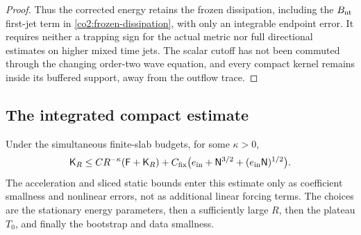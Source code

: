 \begin{proof}
Thus the corrected energy retains the frozen dissipation, including the
$B_{\rm nt}$ first-jet term in \eqref{co2:frozen-dissipation}, with only an
integrable endpoint error.  It requires neither a trapping sign for the
actual metric nor full directional estimates on higher mixed time jets.
The scalar cutoff has not been commuted through the changing order-two wave
equation, and every compact kernel remains inside its buffered support,
away from the outflow trace.
\end{proof}

\subsection{The integrated compact estimate}

\begin{proposition}\label{co2:compact-high}
Under the simultaneous finite-slab budgets, for some $\kappa>0$,
\begin{equation}\label{co2:high-bound}
 \mathsf K_R\le C R^{-\kappa}(\mathsf F+\mathsf K_R)
       +C_{\rm fix}\bigl(e_{\rm in}+\mathsf N^{3/2}
                                 +(e_{\rm in}\mathsf N)^{1/2}\bigr).
\end{equation}
The acceleration and sliced static bounds enter this estimate only as
coefficient smallness and nonlinear errors, not as additional linear forcing
terms.  The choices are the stationary energy parameters, then a sufficiently
large $R$, then the plateau $T_0$, and finally the bootstrap and data
smallness.
\end{proposition}

